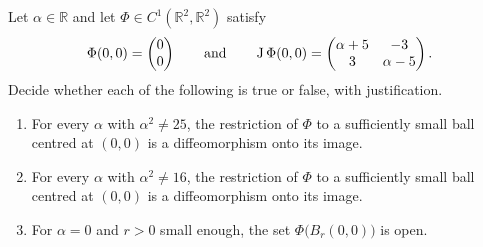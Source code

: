 \begin{exercise}
\label{ex:local_diffeo_parameter_alpha}
Let $\alpha \in \mathbb{R}$ and let $\Phi \in C^1(\mathbb{R}^2,\mathbb{R}^2)$ satisfy
\[\Phi(0,0) = \begin{pmatrix} 0 \\ 0 \end{pmatrix} \qquad\text{and}\qquad
  \operatorname{J}\Phi(0,0) = \begin{pmatrix} \alpha+5 & -3 \\ 3 & \alpha-5 \end{pmatrix}.\]
Decide whether each of the following is true or false, with justification.
\begin{enumerate}[label=\textbf{(\alph*)}]
  \item For every $\alpha$ with $\alpha^2 \neq 25$, the restriction of $\Phi$ to a sufficiently
    small ball centred at $(0,0)$ is a diffeomorphism onto its image.
  \item For every $\alpha$ with $\alpha^2 \neq 16$, the restriction of $\Phi$ to a sufficiently
    small ball centred at $(0,0)$ is a diffeomorphism onto its image.
  \item For $\alpha = 0$ and $r > 0$ small enough, the set $\Phi\big(B_r(0,0)\big)$ is open.
\end{enumerate}
\end{exercise}

